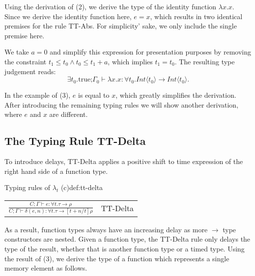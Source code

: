 Using the derivation of {\scriptsize (2)}, we derive the type of the identity function $\lambda x.x$.
Since we derive the identity function here, $e = x$, which results in two identical premises for the rule TT-Abs.
For simplicity' sake, we only include the single premise here.

\begin{prooftree}
\end{prooftree}
We take $a=0$ and simplify this expression for presentation purposes by removing the constraint $t_1 \leq t_0 \land t_0 \leq t_1 + a$, which implies $t_1 = t_0$.
The resulting type judgement reads:
\[\exists t_0.\text{true;}\Gamma_0 \vdash \lambda x.x : \forall t_0. \textit{Int} \langle t_0 \rangle \to \textit{Int} \langle t_0 \rangle.\]

In the example of {\scriptsize (3)}, $e$ is equal to $x$, which greatly simplifies the derivation. 
After introducing the remaining typing rules we will show another derivation, where $e$ and $x$ are different.

\subsection{The Typing Rule TT-Delta}
To introduce delays, TT-Delta applies a positive shift to time expression of the right hand side of a function type.
\begin{definitiontitled}{Typing rules of $\lambda_t$ (c)}{def:tt-delta}
\centering
\begin{tabular}{l l}
$ \displaystyle
\frac{ C;\Gamma \vdash e : \forall t. \tau \rightarrow \rho 
} { C;\Gamma \vdash \delta(e,n) : \forall t. \tau \rightarrow [t+n/t]\rho}
$ &
TT-Delta\\
\end{tabular}
\end{definitiontitled}

As a result, function types always have an increasing delay as more $\to$ type constructors are nested.
Given a function type, the TT-Delta rule only delays the type of the result, whether that is another function type or a timed type.
Using the result of {\scriptsize (3)}, we derive the type of a function which represents a single memory element as follows.

